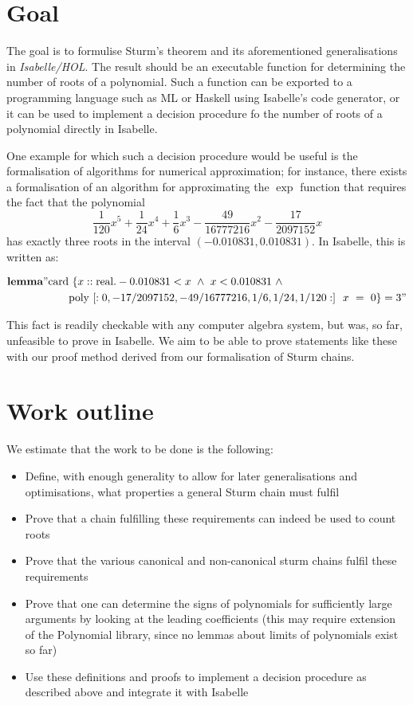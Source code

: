\documentclass[11pt,a4paper,oneside]{article}
\newcommand{\isabellehol}{\mbox{Isabelle}\slash HOL}
\begin{document}
\section{Goal}

The goal is to formulise Sturm's theorem and its aforementioned generalisations 
in \emph{\isabellehol}. The result should be an executable function for 
determining the number of roots of a polynomial. Such a function can be 
exported to a programming language such as ML or Haskell using Isabelle's 
code generator, or it can be used to implement a decision procedure fo the 
number of roots of a polynomial directly in Isabelle.

One example for which such a decision procedure would be useful is the 
formalisation of algorithms for numerical approximation; for instance, there 
exists a formalisation of an algorithm for approximating the $\exp$ function 
that requires the fact that the polynomial 
$$\frac{1}{120}x^5+\frac{1}{24}x^4+\frac{1}{6}x^3-\frac{49}{16777216}x^2-\frac{17}{2097152}x$$
has exactly three roots in the interval $(-0.010831,0.010831)$. In Isabelle, this 
is written as:

\vspace*{-5mm}
\begin{align*}
&\textbf{lemma} "\mathrm{card}\ \{x::\mathrm{real}. -0.010831 < x\ \wedge\ x < 0.010831\ \wedge\\
&\hskip20mm \mathrm{poly}\ [:0, -17/2097152, -49/16777216, 1/6, 1/24, 1/120:]\ \ x\ =\ 0\} = 3"
\end{align*}

This fact is readily checkable with any computer algebra system, but was, so far, 
unfeasible to prove in Isabelle. We aim to be able to prove statements like these 
with our proof method derived from our formalisation of Sturm chains.


\section{Work outline}
We estimate that the work to be done is the following:
\begin{itemize}
\item Define, with enough generality to allow for later generalisations and optimisations, what 
      properties a general Sturm chain must fulfil
\item Prove that a chain fulfilling these requirements can indeed be used to count roots
\item Prove that the various canonical and non-canonical sturm chains fulfil these requirements
\item Prove that one can determine the signs of polynomials for sufficiently large arguments by 
      looking at the leading coefficients (this may require extension of the Polynomial library,
      since no lemmas about limits of polynomials exist so far)
\item Use these definitions and proofs to implement a decision procedure as described above and 
      integrate it with Isabelle
\end{itemize}
\end{document}
